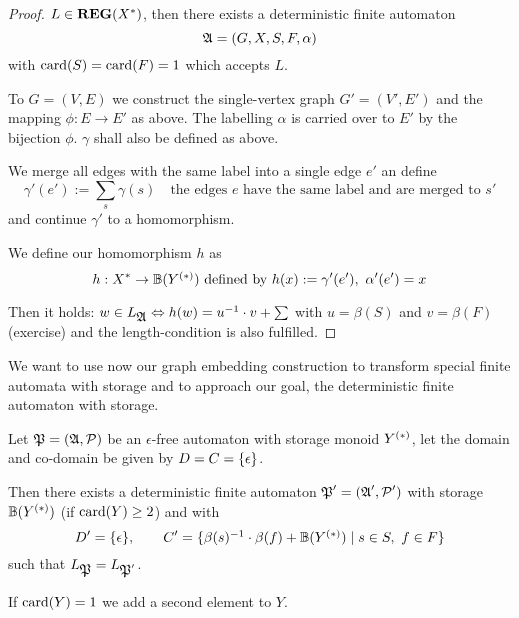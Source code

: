\begin{proof}
$L \in \mbox{{\bf REG}}(X^*)$, then there exists a deterministic finite automaton
\[ \mbox{$\mathfrak{A}$} = (G, X, S, F, \alpha) \]
with $\mathrm{card}({S}) = \mathrm{card}({F}) = 1$ which accepts $L$.

To $G = (V, E)$ we construct the single-vertex graph $G' = (V', E')$ and the
mapping $\phi:
E \to E'$ as above. The labelling $\alpha$ is carried over to $E'$ by the
bijection $\phi$. $\gamma$ shall also be defined as above.

We merge all edges with the same label into a single edge $e'$ an define
\[ \gamma'(e') := \sum_{s} \gamma(s) \quad\text{the edges $e$ have the same
label and are merged to $s'$} \]
and continue $\gamma'$ to a homomorphism.

We define our homomorphism $h$ as
\[ h: X^* \to \mathbb{B}(\mbox{${Y}^{(*)}$})\text{ defined by }h(x) := \gamma'(e'),\
\alpha'(e') = x \]

Then it holds: $w \in L_{\mbox{$\mathfrak{A}$}} \Leftrightarrow h(w) = u^{-1} \cdot v + \sum$
with $u = \beta(S)$ and $v = \beta(F)$ (exercise) and the length-condition is
also fulfilled.
\end{proof}

\bigskip
We want to use now our graph embedding construction to transform special finite
automata with storage and to approach our goal, the deterministic finite
automaton with storage.

\begin{theorem}
Let $\mbox{$\mathfrak{P}$} = (\mbox{$\mathfrak{A}$}, \mbox{$\mathcal{P}$})$ be an $\epsilon$-free automaton with
storage monoid $\mbox{${Y}^{(*)}$}$, let the domain and co-domain be given by $D = C
= \mbox{$\{\epsilon\}$}$.

Then there exists a deterministic finite automaton $\mbox{$\mathfrak{P}$}' = (\mbox{$\mathfrak{A}$}', \mbox{$\mathcal{P}$}')$
with storage $\mathbb{B}(\mbox{${Y}^{(*)}$})$ (if $\mathrm{card}({Y}) \geq 2$) and with
\[ D' = \mbox{$\{\epsilon\}$},\qquad C' = \mbox{$\{\beta(s)^{-1} \cdot \beta(f) +
\mathbb{B}(\mbox{${Y}^{(*)}$}) \mid s\in S,\ f\in F\}$} \]
such that $L_{\mbox{$\mathfrak{P}$}} = L_{\mbox{$\mathfrak{P}$}'}$.

If $\mathrm{card}({Y}) = 1$ we add a second element to $Y$.
\end{theorem}

